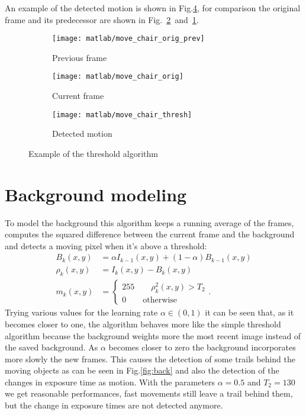 \documentclass[a4paper,oneside]{article}
\begin{document}
An example of the detected motion is shown in Fig.\ref{fig:thresh},
for comparison the original frame and its predecessor are shown in
Fig.~\ref{fig:thresh_orig}~and~\ref{fig:thresh_orig_prev}.
\begin{figure}[htbp]
  \centering
  \begin{subfigure}{0.3\textwidth}
    \centering
    \texttt{[image: matlab/move\_chair\_orig\_prev]}
    \caption{Previous frame}
    \label{fig:thresh_orig_prev}
  \end{subfigure}%
  \begin{subfigure}{0.3\textwidth}
    \centering
    \texttt{[image: matlab/move\_chair\_orig]}
    \caption{Current frame}
    \label{fig:thresh_orig}
  \end{subfigure}%
  \begin{subfigure}{0.3\textwidth}
    \centering
    \texttt{[image: matlab/move\_chair\_thresh]}
    \caption{Detected motion}
    \label{fig:thresh}
  \end{subfigure}%
  \caption{Example of the threshold algorithm}
\end{figure}

\section*{Background modeling}
To model the background this algorithm keeps a running average of the
frames, computes the squared difference between the current frame and
the background and detects a moving pixel when it's above a threshold:
\begin{align}
  B_k(x,y) &= \alpha I_{k-1}(x,y) + (1-\alpha)B_{k-1}(x,y) \\
  \rho_k(x,y) &= I_k(x,y) - B_k(x,y) \\
  m_k(x,y) &= \begin{cases}
    255 \qquad \rho_k^2(x,y) > T_2 \\
    0 \qquad \text{otherwise}
    \end{cases} .
\end{align}
Trying various values for the learning rate $\alpha \in (0,1)$ it can
be seen that, as it becomes closer to one, the algorithm behaves more
like the simple threshold algorithm because the background weights
more the most recent image instead of the saved background. As
$\alpha$ becomes closer to zero the background incorporates more
slowly the new frames. This causes the detection of some trails behind
the moving objects as can be seen in Fig.\ref{fig:back} and also the
detection of the changes in exposure time as motion. With the
parameters $\alpha = 0.5$ and $T_2 = 130$ we get reasonable
performances, fast movements still leave a trail behind them, but the
change in exposure times are not detected anymore.
\end{document}
